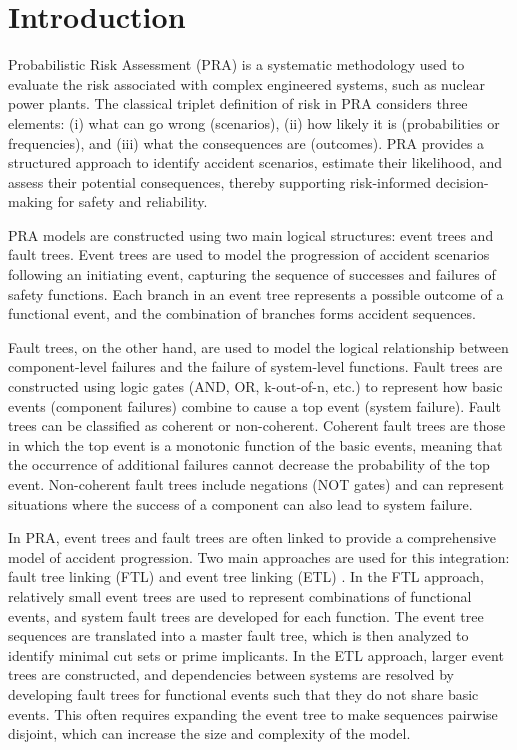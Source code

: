 \section{Introduction}

Probabilistic Risk Assessment (PRA) is a systematic methodology used to evaluate the risk associated with complex engineered systems, such as nuclear power plants. The classical triplet definition of risk in PRA considers three elements: (i) what can go wrong (scenarios), (ii) how likely it is (probabilities or frequencies), and (iii) what the consequences are (outcomes). PRA provides a structured approach to identify accident scenarios, estimate their likelihood, and assess their potential consequences, thereby supporting risk-informed decision-making for safety and reliability.

PRA models are constructed using two main logical structures: event trees and fault trees. Event trees are used to model the progression of accident scenarios following an initiating event, capturing the sequence of successes and failures of safety functions. Each branch in an event tree represents a possible outcome of a functional event, and the combination of branches forms accident sequences.

Fault trees, on the other hand, are used to model the logical relationship between component-level failures and the failure of system-level functions. Fault trees are constructed using logic gates (AND, OR, k-out-of-n, etc.) to represent how basic events (component failures) combine to cause a top event (system failure). Fault trees can be classified as coherent or non-coherent. Coherent fault trees are those in which the top event is a monotonic function of the basic events, meaning that the occurrence of additional failures cannot decrease the probability of the top event. Non-coherent fault trees include negations (NOT gates) and can represent situations where the success of a component can also lead to system failure.

In PRA, event trees and fault trees are often linked to provide a comprehensive model of accident progression. Two main approaches are used for this integration: fault tree linking (FTL) and event tree linking (ETL) \cite{nusbaumer2013fault}. In the FTL approach, relatively small event trees are used to represent combinations of functional events, and system fault trees are developed for each function. The event tree sequences are translated into a master fault tree, which is then analyzed to identify minimal cut sets or prime implicants. In the ETL approach, larger event trees are constructed, and dependencies between systems are resolved by developing fault trees for functional events such that they do not share basic events. This often requires expanding the event tree to make sequences pairwise disjoint, which can increase the size and complexity of the model.

